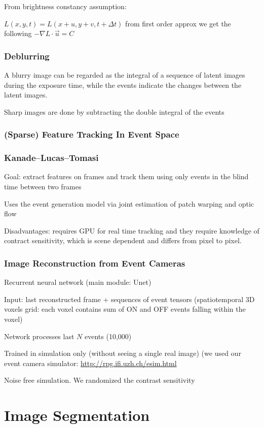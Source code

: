 From brightness constancy assumption:

$L(x,y,t) = L(x+u,y+v,t+\Delta t)$ from first order approx we get the following $-\nabla L \cdot \vec u = C$

\subsubsection{Deblurring}

A blurry image can be regarded as the integral of a sequence of latent images during the exposure time, while the events indicate the changes between the latent images.

Sharp images are done by subtracting the double integral of the events

\subsubsection{(Sparse) Feature Tracking In Event Space}

\subsubsection{Kanade–Lucas–Tomasi}

Goal: extract features on frames and track them using only events in the blind time between two frames

Uses the event generation model via joint estimation of patch warping and optic flow

Disadvantages: requires GPU for real time tracking and they require knowledge of contract sensitivity, which is scene dependent and differs from pixel to pixel.	

\subsubsection{Image Reconstruction from Event Cameras}

Recurrent neural network (main module: Unet) 

Input: last reconstructed frame + sequences of event tensors (spatiotemporal 3D voxels grid: each voxel contains sum of ON and OFF events falling within the voxel)

Network processes last $N$ events (10,000) 

Trained in simulation only (without seeing a single real image) (we used our event camera simulator: \url{http://rpg.ifi.uzh.ch/esim.html} 

Noise free simulation. We randomized the contrast sensitivity


\section{Image Segmentation}

